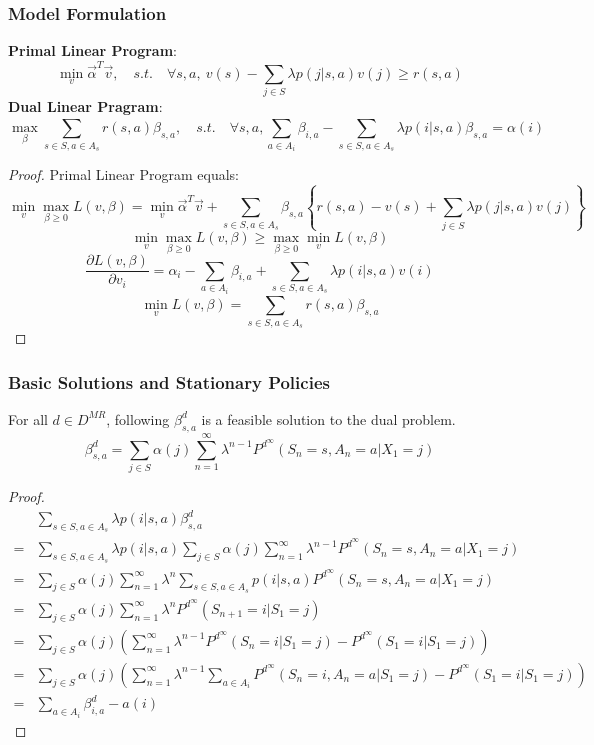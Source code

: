 \subsubsection{Model Formulation}%

\textbf{Primal Linear Program}:
\[
    \min_{v} \vec{\alpha}^T \vec{v}, \quad{s.t.}\quad \forall s, a,\ v(s) - \sum^{}_{j\in S} \lambda p(j|s,a) v(j) \ge r(s,a)
\]
\textbf{Dual Linear Pragram}:
\[
    \max_{\beta} \sum^{}_{s\in S, a \in A_s} r(s,a) \beta_{s,a},\quad{s.t.}\quad
    \forall s,a, \sum^{}_{a \in A_i} \beta_{i,a} - \sum^{}_{s \in S, a \in A_s} \lambda p(i|s,a) \beta_{s,a} = \alpha(i)
\]

\begin{proof}
    Primal Linear Program equals:
    \[
         \min_{v} \max_{\beta \ge 0} L(v, \beta)= \min_{v} \vec{\alpha}^T \vec{v}+ \sum^{}_{s\in S,a\in A_s} \beta_{s,a} \left\{ r(s,a) - v(s) + \sum^{}_{j \in S}\lambda p(j|s,a) v(j)  \right\}
    \]
    \[
        \min_{v} \max_{\beta \ge 0} L(v, \beta) \ge \max_{\beta \ge 0} \min_{v} L(v, \beta)
    \]
    \[
        \frac{\partial{L(v, \beta)}}{\partial{v_i}} = \alpha_i - \sum^{}_{a \in A_i} \beta_{i, a} + \sum^{}_{s \in S, a\in A_s} \lambda p(i | s, a) v(i)
    \]
    \[
        \min_{v} L(v, \beta) = \sum^{}_{s \in S, a \in A_s} r(s,a) \beta_{s,a}
    \]
\end{proof}

\subsubsection{Basic Solutions and Stationary Policies}%

For all $ d \in D^{MR} $, following $ \beta^{d}_{s,a} $ is a feasible solution to the dual problem.
\[
    \beta^d_{s,a} = \sum^{}_{j\in S} \alpha(j) \sum^{\infty}_{n=1} \lambda^{n-1} P^{d^{\infty}} (S_n = s, A_n = a | X_1 = j)
\]
\begin{proof}
    \begin{align*}
        &\sum^{}_{s\in S, a \in A_s} \lambda p(i|s,a) \beta^d_{s,a} \\
        =& \sum^{}_{s\in S, a \in A_s} \lambda p(i|s,a) \sum^{}_{j\in S} \alpha(j) \sum^{\infty}_{n=1} \lambda^{n-1} P^{d^{\infty}} (S_n = s, A_n = a | X_1 = j)\\
        =& \sum^{}_{j\in S} \alpha(j) \sum^{\infty}_{n=1} \lambda^{n} \sum^{}_{s\in S, a \in A_s} p(i|s,a) P^{d^{\infty}} (S_n = s, A_n = a | X_1 = j)\\
        =& \sum^{}_{j\in S} \alpha(j) \sum^{\infty}_{n=1} \lambda^{n} P^{d^\infty}(S_{n+1}=i | S_1 = j)\\
        =& \sum^{}_{j\in S} \alpha(j) ( \sum^{\infty}_{n=1} \lambda^{n-1} P^{d^{\infty}}(S_n = i | S_1 = j) - P^{d^\infty} (S_1 = i | S_1 = j) )\\
        =& \sum^{}_{j\in S} \alpha(j) ( \sum^{\infty}_{n=1} \lambda^{n-1} \sum^{}_{a \in A_i} P^{d^{\infty}}(S_n = i, A_n = a | S_1 = j) - P^{d^\infty} (S_1 = i | S_1 = j) )\\
        =& \sum^{}_{a \in A_i} \beta^{d}_{i,a} - a(i)
    \end{align*}
\end{proof}

